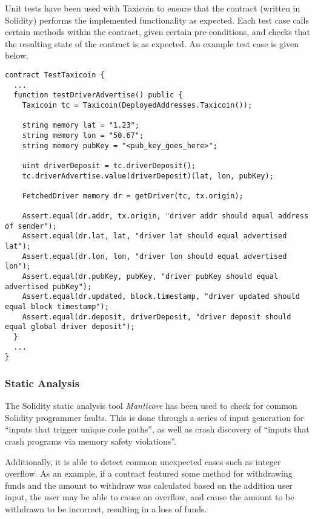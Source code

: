 Unit tests have been used with Taxicoin to ensure that the contract (written in Solidity) performs the implemented functionality as expected. Each test case calls certain methods within the contract, given certain pre-conditions, and checks that the resulting state of the contract is as expected. An example test case is given below.

\begin{lstlisting}[language=Solidity]
contract TestTaxicoin {
  ...
  function testDriverAdvertise() public {
    Taxicoin tc = Taxicoin(DeployedAddresses.Taxicoin());

    string memory lat = "1.23";
    string memory lon = "50.67";
    string memory pubKey = "<pub_key_goes_here>";

    uint driverDeposit = tc.driverDeposit();
    tc.driverAdvertise.value(driverDeposit)(lat, lon, pubKey);

    FetchedDriver memory dr = getDriver(tc, tx.origin);

    Assert.equal(dr.addr, tx.origin, "driver addr should equal address of sender");
    Assert.equal(dr.lat, lat, "driver lat should equal advertised lat");
    Assert.equal(dr.lon, lon, "driver lon should equal advertised lon");
    Assert.equal(dr.pubKey, pubKey, "driver pubKey should equal advertised pubKey");
    Assert.equal(dr.updated, block.timestamp, "driver updated should equal block timestamp");
    Assert.equal(dr.deposit, driverDeposit, "driver deposit should equal global driver deposit");
  }
  ...
}
\end{lstlisting}

\subsubsection{Static Analysis}


The Solidity static analysis tool \textit{Manticore} has been used to check for common Solidity programmer faults. This is done through a series of input generation for \enquote{inputs that trigger unique code paths}, as well as crash discovery of \enquote{inputs that crash programs via memory safety violations}.

Additionally, it is able to detect common unexpected cases such as integer overflow. As an example, if a contract featured some method for withdrawing funds and the amount to withdraw was calculated based on the addition user input, the user may be able to cause an overflow, and cause the amount to be withdrawn to be incorrect, resulting in a loss of funds.

